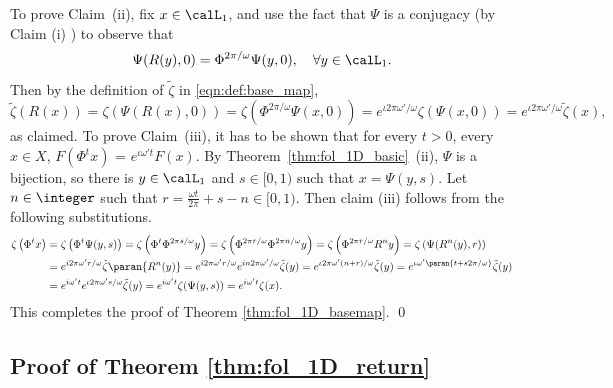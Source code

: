 \documentclass[12pt,oneside]{article}
\newcommand{\Return}{R}
\newcommand{\Iso}{\Psi}
\begin{document}
To prove Claim~(ii), fix $x\in \calL_1$, and use the fact that $\Iso$ is a conjugacy (by Claim (i) ) to observe that 
%
\[ \Iso(\Return(y),0) = \Phi^{2\pi/\omega}\Iso(y,0), \quad \forall y\in \calL_1. %
\]
Then by the definition of $\tilde{\zeta}$ in \eqref{eqn:def:base_map},
%
\[ \tilde{\zeta} \left( \Return(x) \right) =  \zeta\left( \Iso(\Return(x),0) \right) =  \zeta \left( \Phi^{2\pi/\omega} \Iso(x,0) \right) = e^{\iota 2\pi \omega'/\omega} \zeta\left( \Iso(x,0)\right) = e^{\iota 2\pi \omega'/\omega} \tilde{\zeta} (x), \]
as claimed. To prove Claim~(iii), it has to be shown that for every $t>0$, every $x\in X$, $F\left( \Phi^{t} x \right)$ = $e^{\iota \omega' t} F(x)$. By Theorem~\ref{thm:fol_1D_basic}~(ii), $\Iso$ is a bijection, so there is $y\in \calL_1$ and $s\in [0,1)$ such that $x= \Iso(y,s)$. Let $n\in\integer$ such that $r=\frac{\omega t}{2\pi} + s -n \in [0,1)$. Then claim (iii) follows from the following substitutions.
%
\[\begin{split}
\zeta \left( \Phi^t x \right) &= \zeta \left( \Phi^t \Iso(y,s) \right) = \zeta \left( \Phi^t \Phi^{2\pi s/\omega} y \right) = \zeta \left( \Phi^{2\pi r/\omega} \Phi^{2\pi n/\omega} y \right) = \zeta \left(  \Phi^{2\pi r/\omega} \Return^{n} y \right) = \zeta \left( \Iso(\Return^{n}(y),r) \right)\\
& = e^{i 2\pi \omega' r/\omega} \tilde{\zeta} \paran{\Return^{n}(y)} = e^{i 2\pi \omega' r/\omega} e^{in2\pi \omega'/\omega} \tilde{\zeta}(y) = e^{ \iota 2 \pi \omega'(n+r)/\omega} \tilde{\zeta}(y) = e^{ \iota \omega' \paran{ t + s 2\pi/\omega } } \tilde{\zeta}(y) \\
& =e^{i \omega't} e^{ \iota 2 \pi \omega' s/\omega} \tilde{\zeta}(y) = e^{i \omega't} \zeta(\Iso(y,s)) = e^{i \omega't} \zeta(x). \\
\end{split}\]
%
This completes the proof of Theorem \ref{thm:fol_1D_basemap}. \qed

\subsection{Proof of Theorem \ref{thm:fol_1D_return}} \label{sec:proof:BI}
\end{document}
